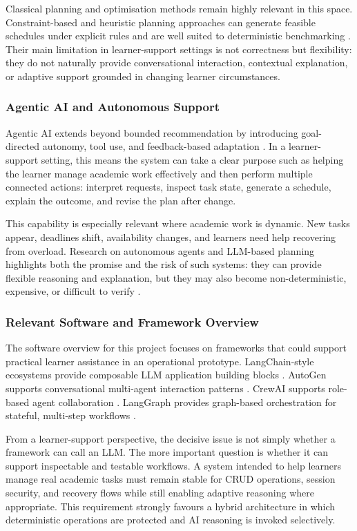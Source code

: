 \documentclass[12pt]{article}
\begin{document}
Classical planning and optimisation methods remain highly relevant in this space. Constraint-based and heuristic planning approaches can generate feasible schedules under explicit rules and are well suited to deterministic benchmarking \parencite{ghallab2016automated}. Their main limitation in learner-support settings is not correctness but flexibility: they do not naturally provide conversational interaction, contextual explanation, or adaptive support grounded in changing learner circumstances.

\subsubsection{Agentic AI and Autonomous Support}
Agentic AI extends beyond bounded recommendation by introducing goal-directed autonomy, tool use, and feedback-based adaptation \parencite{bandi2025rise}. In a learner-support setting, this means the system can take a clear purpose such as helping the learner manage academic work effectively and then perform multiple connected actions: interpret requests, inspect task state, generate a schedule, explain the outcome, and revise the plan after change.

This capability is especially relevant where academic work is dynamic. New tasks appear, deadlines shift, availability changes, and learners need help recovering from overload. Research on autonomous agents and LLM-based planning highlights both the promise and the risk of such systems: they can provide flexible reasoning and explanation, but they may also become non-deterministic, expensive, or difficult to verify \parencite{wang2024survey}.

\subsubsection{Relevant Software and Framework Overview}
The software overview for this project focuses on frameworks that could support practical learner assistance in an operational prototype. LangChain-style ecosystems provide composable LLM application building blocks \parencite{chase2022langchain}. AutoGen supports conversational multi-agent interaction patterns \parencite{autogen2023}. CrewAI supports role-based agent collaboration \parencite{crewai2024}. LangGraph provides graph-based orchestration for stateful, multi-step workflows \parencite{langgraph2024}.

From a learner-support perspective, the decisive issue is not simply whether a framework can call an LLM. The more important question is whether it can support inspectable and testable workflows. A system intended to help learners manage real academic tasks must remain stable for CRUD operations, session security, and recovery flows while still enabling adaptive reasoning where appropriate. This requirement strongly favours a hybrid architecture in which deterministic operations are protected and AI reasoning is invoked selectively.
\end{document}

